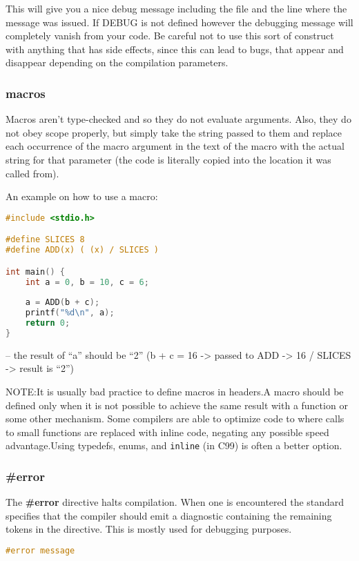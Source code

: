 This will give you a nice debug message including the file and the line where
the message was issued. If DEBUG is not defined however the debugging message
will completely vanish from your code. Be careful not to use this sort of
construct with anything that has side effects, since this can lead to bugs,
that appear and disappear depending on the compilation parameters.

\subsubsection{macros}
Macros aren't type-checked and so they do not evaluate arguments. Also, they do
not obey scope properly, but simply take the string passed to them and replace
each occurrence of the macro argument in the text of the macro with the actual
string for that parameter (the code is literally copied into the location it
was called from).

An example on how to use a macro:
\lstset{basicstyle=\scriptsize, numbers=left, captionpos=b, tabsize=4}
\begin{lstlisting}[caption=Section \thesection listing \arabic{preprocnt},language={C},
breaklines=true,xleftmargin=15pt, label=lst:section\thesection listing\arabic{preprocnt}]
#include <stdio.h>

#define SLICES 8
#define ADD(x) ( (x) / SLICES )

int main() {
	int a = 0, b = 10, c = 6;
	
	a = ADD(b + c);
	printf("%d\n", a);
	return 0;
}
\end{lstlisting}

-- the result of ``a'' should be ``2'' (b + c = 16 -\textgreater{} passed to
ADD -\textgreater{} 16 / SLICES -\textgreater{} result is ``2'')

NOTE:It is usually bad practice to define macros in headers.A macro should
be defined only when it is not possible to achieve the same result with a
function or some other mechanism. Some compilers are able to optimize code to
where calls to small functions are replaced with inline code, negating any
possible speed advantage.Using typedefs, enums, and \texttt{inline} (in C99) is
often a better option.

\subsubsection{\#error}
The \textbf{\#error} directive halts compilation. When one is encountered the
standard specifies that the compiler should emit a diagnostic containing the
remaining tokens in the directive. This is mostly used for debugging purposes.
\lstset{basicstyle=\scriptsize, numbers=left, captionpos=b, tabsize=4}
\begin{lstlisting}[caption=Section \thesection listing \arabic{preprocnt},language={C},
breaklines=true,xleftmargin=15pt, label=lst:section\thesection listing\arabic{preprocnt}]
#error message
\end{lstlisting}

